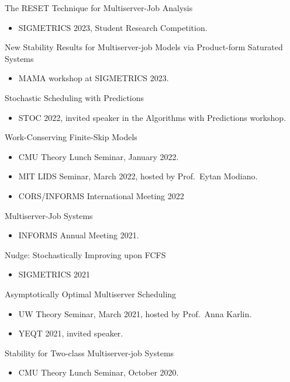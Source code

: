 \documentclass{res}
\begin{document}
\begin{resume}
    The RESET Technique for Multiserver-Job Analysis
    \begin{itemize}
        \item SIGMETRICS 2023, Student Research Competition. 
    \end{itemize}

    New Stability Results for Multiserver-job Models via Product-form Saturated Systems
    \begin{itemize}
        \item MAMA workshop at SIGMETRICS 2023.
    \end{itemize}

    Stochastic Scheduling with Predictions
    \begin{itemize}
        \item STOC 2022, invited speaker in the Algorithms with Predictions workshop.
    \end{itemize}

    Work-Conserving Finite-Skip Models
    \begin{itemize}
        \item CMU Theory Lunch Seminar, January 2022.
        \item MIT LIDS Seminar, March 2022, hosted by Prof.~Eytan Modiano.
        \item CORS/INFORMS International Meeting 2022
    \end{itemize}

    Multiserver-Job Systems
    \begin{itemize}
        \item INFORMS Annual Meeting 2021.
    \end{itemize}

    Nudge: Stochastically Improving upon FCFS
    \begin{itemize}
        \item SIGMETRICS 2021 
    \end{itemize}

    Asymptotically Optimal Multiserver Scheduling
    \begin{itemize}
        \item UW Theory Seminar, March 2021, hosted by Prof.~Anna Karlin.
        \item YEQT 2021, invited speaker.
    \end{itemize}

    Stability for Two-class Multiserver-job Systems
    \begin{itemize}
        \item CMU Theory Lunch Seminar, October 2020.
    \end{itemize}


\end{resume}
\end{document}

